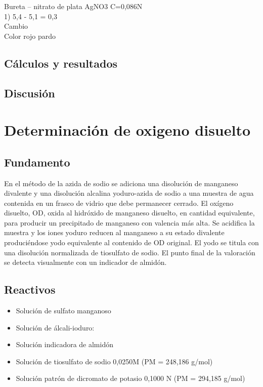 \documentclass[a4paper,12pt]{article} %
\begin{document}
Bureta -- nitrato de plata AgNO3 C=0,086N \\
1) 5,4 - 5,1 = 0,3 \\
Cambio \\
Color rojo pardo \\

\subsection{Cálculos y resultados}

\subsection{Discusión}



\newpage

\section{Determinación de oxigeno disuelto}

\subsection{Fundamento}
En el método de la azida de sodio se adiciona una disolución de manganeso divalente y una disolución alcalina yoduro-azida de sodio a una muestra de agua contenida en un frasco de vidrio que debe permanecer cerrado. El oxígeno disuelto, OD, oxida al hidróxido de manganeso disuelto, en cantidad equivalente, para producir un precipitado de manganeso con valencia más alta. Se acidifica la muestra y los iones yoduro reducen al manganeso a su estado divalente produciéndose yodo equivalente al contenido de OD original. El yodo se titula con una disolución normalizada de tiosulfato de sodio. El punto final de la valoración se detecta visualmente con un indicador de almidón.      

\subsection{Reactivos} 
\begin{itemize}
    \item{Solución de sulfato manganoso} 
    \item{Solución de álcali-ioduro: }
    \item{Solución indicadora de almidón}
    \item{Solución de tiosulfato de sodio 0,0250M (PM = 248,186 g/mol) }
    \item{Solución patrón de dicromato de potasio 0,1000 N (PM = 294,185 g/mol)}
\end{itemize}
\end{document}
